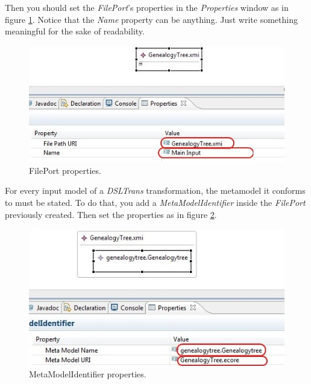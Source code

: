 Then you should set the \emph{FilePort}'s properties in the \emph{Properties}
window as in figure \ref{fig:file_port_properties}. Notice that the
\emph{Name} property can be anything. Just write something meaningful for the
sake of readability.

\begin{figure}[h]
\begin{center}
  \includegraphics[scale=0.7]{imgs/file_port_properties.jpg}
  \caption{FilePort properties.}
  \label{fig:file_port_properties}
\end{center}
\end{figure}

For every input model of a \emph{DSLTrans} transformation, the metamodel it
conforms to must be stated. To do that, you add a \emph{MetaModelIdentifier}
inside the \emph{FilePort} previously created. Then set the properties as in
figure \ref{fig:meta_id_properties}.

\begin{figure}[h]
\begin{center}
  \includegraphics[scale=0.7]{imgs/meta_id_properties.jpg}
  \caption{MetaModelIdentifier properties.}
  \label{fig:meta_id_properties}
\end{center}
\end{figure}

